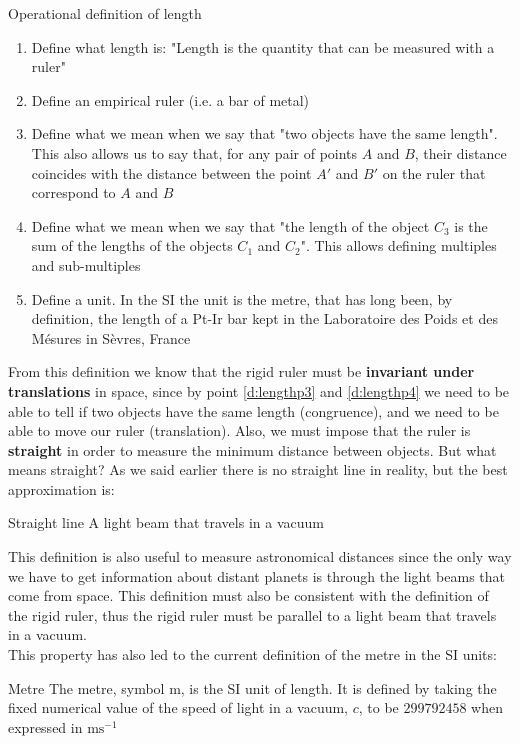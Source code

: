 \begin{definition}{Operational definition of length}
  \begin{enumerate}
    \item Define what length is: "Length is the quantity that can be measured with a ruler"
    \item Define an empirical ruler (i.e. a bar of metal)
    \item Define what we mean when we say that "two objects have the same length". This also allows us to say that, for any pair of points $A$ and $B$, their distance coincides with the distance between the point $A'$ and $B'$ on the ruler that correspond to $A$ and $B$ \label{d:lengthp3}
    \item Define what we mean when we say that "the length of the object $C_3$ is the sum of the lengths of the objects $C_1$ and $C_2$". This allows defining multiples and sub-multiples \label{d:lengthp4}
    \item Define a unit. In the SI the unit is the metre, that has long been, by definition, the length of a Pt-Ir bar kept in the Laboratoire des Poids et des Mésures in Sèvres, France
  \end{enumerate}
\end{definition}
From this definition we know that the rigid ruler must be \textbf{invariant under translations} in space, since by point \eqref{d:lengthp3} and \eqref{d:lengthp4} we need to be able to tell if two objects have the same length (congruence), and we need to be able to move our ruler (translation). Also, we must impose that the ruler is \textbf{straight} in order to measure the minimum distance between objects. But what means straight? As we said earlier there is no straight line in reality, but the best approximation is:
\begin{definition}{Straight line}
  A light beam that travels in a vacuum
\end{definition}
This definition is also useful to measure astronomical distances since the only way we have to get information about distant planets is through the light beams that come from space. This definition must also be consistent with the definition of the rigid ruler, thus the rigid ruler must be parallel to a light beam that travels in a vacuum.\\
This property has also led to the current definition of the metre in the SI units:
\begin{definition}{Metre}
  The metre, symbol m, is the SI unit of length. It is defined by taking the fixed numerical value of the speed of light in a vacuum, $c$, to be $299792458$ when expressed in $\unit{\metre \second^{-1}}$
\end{definition}
